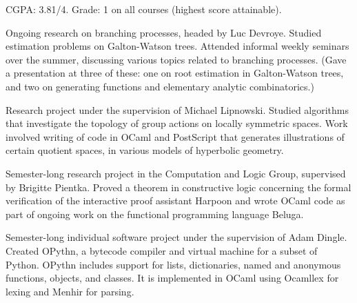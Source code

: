 
CGPA: 3.81/4.
\medbreak
{}
Grade: 1 on all courses (highest score attainable).


\smallskip
{}


\smallskip
Ongoing research on branching processes, headed by Luc Devroye. Studied estimation problems
on Galton-Watson trees. Attended informal weekly seminars over the summer, discussing
various topics related to branching
processes. (Gave a presentation at three of these: one on root estimation in Galton-Watson
trees, and two on generating functions and elementary analytic combinatorics.)

\medbreak
{}
\smallskip
Research project under the supervision of Michael Lipnowski.
Studied algorithms that investigate the topology of group actions on locally symmetric spaces.
Work involved writing of code in OCaml and PostScript that generates illustrations of certain quotient
spaces, in various models of hyperbolic geometry.
\medbreak

\smallskip
Semester-long research project in the Computation and Logic Group, supervised
by Brigitte Pientka.
Proved a theorem in constructive logic concerning the formal verification
of the interactive proof assistant Harpoon and wrote OCaml code as part of
ongoing work on the functional programming language Beluga.
\medbreak

\smallskip
Semester-long individual software project under the supervision of Adam Dingle.
Created OPythn, a bytecode compiler and virtual machine for a subset of Python.
OPythn includes support for lists, dictionaries, named and anonymous functions, objects, and classes.
It is implemented in OCaml using Ocamllex for lexing and Menhir for parsing.

